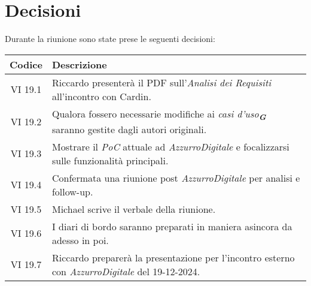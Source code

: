 
\section{Decisioni}

Durante la riunione sono state prese le seguenti decisioni:

\vspace{0.5cm}

\begin{table}[htbp]
    \centering
    \begin{tabular}{|c|p{}|}
        \hline
        \rowcolor[gray]{0.75}
        \textbf{Codice} & \textbf{Descrizione}\\
        \hline
        VI 19.1 & Riccardo presenterà il PDF sull'\emph{Analisi dei Requisiti} all’incontro con Cardin.\\
        \hline
        VI 19.2 & Qualora fossero necessarie modifiche ai \emph{casi d'uso}\textsubscript{\textit{\textbf{G}}} saranno gestite dagli autori originali.\\
        \hline
        VI 19.3 & Mostrare il \emph{PoC} attuale ad \emph{AzzurroDigitale} e focalizzarsi sulle funzionalità principali.\\
        \hline
        VI 19.4 & Confermata una riunione post \emph{AzzurroDigitale} per analisi e follow-up.\\
        \hline
        VI 19.5 & Michael scrive il verbale della riunione.\\
        \hline
        VI 19.6 & I diari di bordo saranno preparati in maniera asincora da adesso in poi.\\
        \hline
        VI 19.7 & Riccardo preparerà la presentazione per l'incontro esterno con \emph{AzzurroDigitale} del 19-12-2024.\\
        \hline
    \end{tabular}
\end{table}
